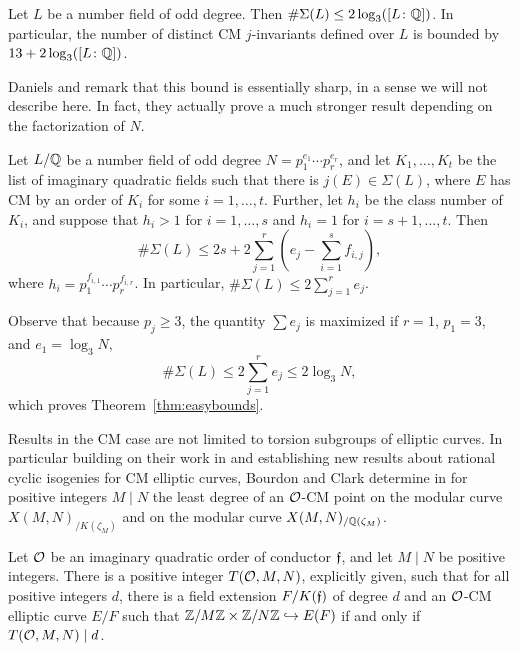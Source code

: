 \begin{thm} \label{thm:easybounds}
Let $L$ be a number field of odd degree. Then $\#\Sigma(L) \leq 2 \log_3([L \colon \mathbb{Q}])$. In particular, the number of distinct CM $j$-invariants defined over $L$ is bounded by $13 + 2 \log_3([L \colon \mathbb{Q}])$. 
\end{thm} 


Daniels and \lozrob{} remark that this bound is essentially sharp, in a sense we will not describe here. In fact, they actually prove a much stronger result depending on the factorization of $N$.


\begin{thm}
Let $L/\mathbb{Q}$ be a number field of odd degree $N= p_1^{e_1} \cdots p_r^{e_r}$, and let $K_1, \ldots, K_t$ be the list of imaginary quadratic fields such that there is $j(E) \in \Sigma(L)$, where $E$ has CM by an order of $K_i$ for some $i= 1, \ldots, t$. Further, let $h_i$ be the class number of $K_i$, and suppose that $h_i > 1$ for $i= 1, \ldots, s$ and $h_i= 1$ for $i= s + 1, \ldots, t$. Then
	\[
	\#\Sigma(L) \leq 2s + 2 \sum_{j=1}^r \left( e_j - \sum_{i=1}^s f_{i,j} \right),
	\]
where $h_i= p_1^{f_{i,1}} \cdots p_r^{f_{i,r}}$. In particular, $\#\Sigma(L) \leq 2 \sum_{j=1}^r e_j$. 
\end{thm}


Observe that because $p_j \geq 3$, the quantity $\sum e_j$ is maximized if $r= 1$, $p_1= 3$, and $e_1= \log_3 N$,
	\[
	\#\Sigma(L) \leq 2 \sum_{j=1}^r e_j \leq 2 \log_3 N,
	\]
which proves Theorem~\ref{thm:easybounds}.


Results in the CM case are not limited to torsion subgroups of elliptic curves. In particular building on their work in \cite{bourdonclark20} and establishing new results about rational cyclic isogenies for CM elliptic curves, Bourdon and Clark determine in \cite{bourdonclark20isog} for positive integers $M \mid N$ the least degree of an $\mathcal{O}$-CM point on the modular curve $X(M,N)_{/K(\zeta_M)}$ and on the modular curve $X(M,N)_{/\mathbb{Q}(\zeta_M)}$. 


\begin{thm}
Let $\mathcal{O}$ be an imaginary quadratic order of conductor $\mathfrak{f}$, and let $M \mid N$ be positive integers. There is a positive integer $T(\mathcal{O}, M, N)$, explicitly given, such that for all positive integers $d$, there is a field extension $F/K(\mathfrak{f})$ of degree $d$ and an $\mathcal{O}$-CM elliptic curve $E/F$ such that $\mathbb{Z}/M\mathbb{Z} \times \mathbb{Z}/N\mathbb{Z} \hookrightarrow E(F)$ if and only if $T(\mathcal{O},M,N) \mid d$. 
\end{thm}


